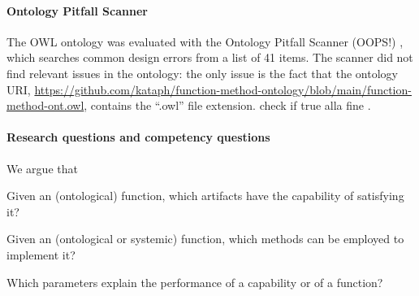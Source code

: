 \documentclass[sw]{iosart2x}
\newcommand{\bflist}{\begin{list}{}{\setlength{\topsep}{2mm}\setlength{\partopsep}{0mm}\setlength{\parsep}{0mm}\setlength{\leftmargin}{9mm}\setlength{\labelwidth}{8mm}}}
\newcommand{\eflist}{\end{list}}
\newcommand{\CQLabel}{\textrm{CQ}}
\newcounter{cntCQ}
\newcommand{\myCQ}[1]{\refstepcounter{cntCQ}\begin{small}{\bf \CQLabel\thecntCQ\label{CQ:#1}}\end{small}}
\newcommand{\OWL}{\textnormal{OWL}\xspace}
\newcommand{\qquotes}[1]{``#1''}
\newcommand{\TODO}[1]{{\color{red} #1
}}
\begin{document}
\paragraph{Ontology Pitfall Scanner} The \OWL ontology was evaluated with the Ontology Pitfall Scanner (OOPS!) \cite{poveda2014oops}, which searches common design errors from a list of 41 items.  
The scanner did not find relevant issues in the ontology: the only issue is the fact that the ontology URI, \url{https://github.com/kataph/function-method-ontology/blob/main/function-method-ont.owl}, contains the \qquotes{.owl} file extension.\TODO{check if true alla fine}.



\paragraph{Research questions and competency questions}
We argue that 

\bflist
  \item[\myCQ{cq2}] Given an (ontological) function, which artifacts have the capability of satisfying it?
  \item[\myCQ{cq3}] Given an (ontological or systemic) function, which methods can be employed to implement it?
  \item[\myCQ{cq8}] Which parameters explain the performance of a capability or of a function?
\eflist
\end{document}
